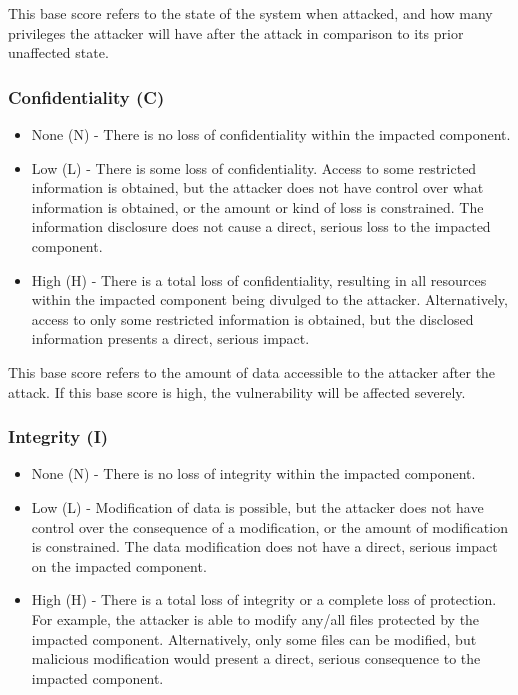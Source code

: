 This base score refers to the state of the system when attacked, and how many privileges the attacker will have after the attack in comparison to its prior unaffected state.

\subsubsection{Confidentiality (C)}

\begin{itemize}
	\item None (N) - There is no loss of confidentiality within the impacted component.
	\item Low (L) - There is some loss of confidentiality. Access to some restricted information is obtained, but the attacker does not have control over what information is obtained, or the amount or kind of loss is constrained. The information disclosure does not cause a direct, serious loss to the impacted component. 
	\item High (H) - There is a total loss of confidentiality, resulting in all resources within the impacted component being divulged to the attacker. Alternatively, access to only some restricted information is obtained, but the disclosed information presents a direct, serious impact.
\end{itemize}

This base score refers to the amount of data accessible to the attacker after the attack. If this base score is high, the vulnerability will be affected severely.

\subsubsection{Integrity (I)}

\begin{itemize}
	\item None (N) - There is no loss of integrity within the impacted component.
	\item Low (L) - Modification of data is possible, but the attacker does not have control over the consequence of a modification, or the amount of modification is constrained. The data modification does not have a direct, serious impact on the impacted component.
	\item High (H) - There is a total loss of integrity or a complete loss of protection. For example, the attacker is able to modify any/all files protected by the impacted component. Alternatively, only some files can be modified, but malicious modification would present a direct, serious consequence to the impacted component.
\end{itemize}

